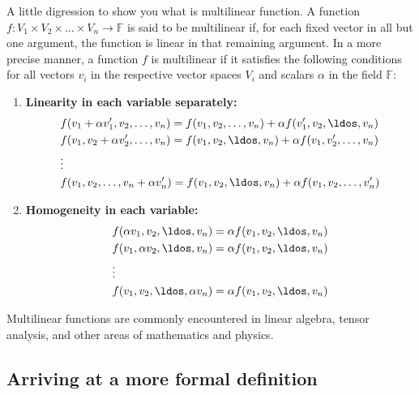 \begin{outline}
    A little digression to show you what is multilinear function.
    A function $f: V_1 \times V_2 \times \ldots \times V_n \rightarrow \mathbb{F}$ is said to be multilinear if, for each fixed vector in all but one argument, the function is linear in that remaining argument. In a more precise manner, a function $f$ is multilinear if it satisfies the following conditions for all vectors $v_i$ in the respective vector spaces $V_i$ and scalars $\alpha$ in the field $\mathbb{F}$:

\begin{enumerate}
    \item \textbf{Linearity in each variable separately:}
    \begin{align*}
        &f(v_1 + \alpha v_1', v_2, \ldots, v_n) = f(v_1, v_2, \ldots, v_n) + \alpha f(v_1', v_2, \ldos, v_n) \\
        &f(v_1, v_2 + \alpha v_2', \ldots, v_n) = f(v_1, v_2, \ldos, v_n) + \alpha f(v_1, v_2', \ldots, v_n) \\
        &\vdots \\
        &f(v_1, v_2, \ldots, v_n + \alpha v_n') = f(v_1, v_2, \ldos, v_n) + \alpha f(v_1, v_2, \ldots, v_n')
    \end{align*}
    
    \item \textbf{Homogeneity in each variable:}
    \begin{align*}
        &f(\alpha v_1, v_2, \ldos, v_n) = \alpha f(v_1, v_2, \ldos, v_n) \\
        &f(v_1, \alpha v_2, \ldos, v_n) = \alpha f(v_1, v_2, \ldos, v_n) \\
        &\vdots \\
        &f(v_1, v_2, \ldos, \alpha v_n) = \alpha f(v_1, v_2, \ldos, v_n)
    \end{align*}
\end{enumerate}

Multilinear functions are commonly encountered in linear algebra, tensor analysis, and other areas of mathematics and physics.

\end{outline}

\subsection{Arriving at a more formal definition}


